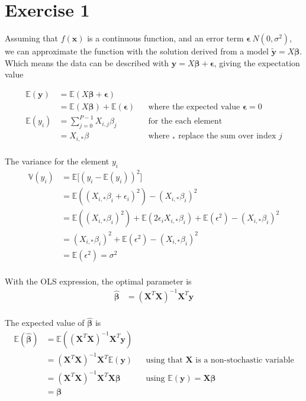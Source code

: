 \section{Exercise 1}\label{sec:ex1}
Assuming that $f(\mathbf{x})$ is a continuous function, and an error term $\mathbf{\epsilon} ~ N(0, \sigma^{2})$, we can approximate the function with the solution derived from a model $\mathbf{\tilde{y}} = X\mathbf{\beta}$. Which means the data can be described with $\boldsymbol{y} = X\mathbf{\beta} + \mathbf{\epsilon}$, giving the expectation value

\begin{align*}
    \mathbb{E}(\mathbf{y}) &= \mathbb{E}(X\mathbf{\beta} + \mathbf{\epsilon}) \\
    &= \mathbb{E}(X\mathbf{\beta}) + \mathbb{E}(\mathbf{\epsilon}) && \text{where the expected value $\mathbf{\epsilon} = 0$} \\
    \mathbb{E}(y_{i}) &= \sum_{j=0}^{P-1} X_{i,j} \beta_{j} && \text{for the each element} \\
    &= X_{i,*} \beta && \text{where $_{*}$ replace the sum over index $j$} \\
\end{align*}

The variance for the element $y_{i}$ 
\begin{align*}
    \mathbb{V}(y_{i}) &= \mathbb{E} \big[ (y_{i} - \mathbb{E}(y_{i}))^{2} \big] \\
    &= \mathbb{E} ((X_{i,*} \beta_{i} + \epsilon_{i})^{2}) - (X_{i,*} \beta_{i})^{2} \\
    &= \mathbb{E} ((X_{i,*} \beta_{i})^{2}) + \mathbb{E} (2\epsilon_{i}X_{i,*} \beta_{i}) + \mathbb{E} (\epsilon^{2}) - (X_{i,*} \beta_{i})^{2} \\
    &= (X_{i,*} \beta_{i})^{2} + \mathbb{E} (\epsilon^{2}) - (X_{i,*} \beta_{i})^{2} \\
    &= \mathbb{E} (\epsilon^{2}) = \sigma^{2} \\
\end{align*}

With the OLS expression, the optimal parameter is
\begin{align*}
    \mathbf{\hat{\beta}} &= (\mathbf{X}^{T} \mathbf{X})^{-1} \mathbf{X}^{T} \mathbf{y} \\
\end{align*}

The expected value of $\mathbf{\hat{\beta}}$ is 
\begin{align*}
    \mathbb{E}(\mathbf{\hat{\beta}}) &= \mathbb{E}((\mathbf{X}^{T} \mathbf{X})^{-1} \mathbf{X}^{T} \mathbf{y}) \\
    &= (\mathbf{X}^{T} \mathbf{X})^{-1} \mathbf{X}^{T} \mathbb{E}(\mathbf{y}) && \text{using that $\mathbf{X}$ is a non-stochastic variable} \\
    &= (\mathbf{X}^{T} \mathbf{X})^{-1} \mathbf{X}^{T} \mathbf{X} \mathbf{\beta} && \text{using $\mathbb{E}(\mathbf{y}) = \mathbf{X} \mathbf{\beta}$} \\
    &= \mathbf{\beta} \\
\end{align*}

